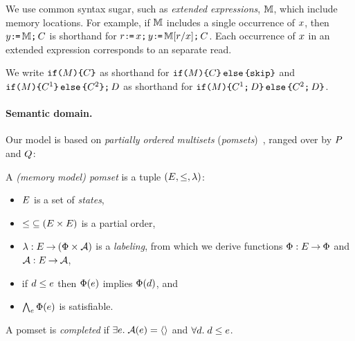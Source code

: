 We use common syntax sugar, such as \emph{extended expressions}, $\mathbb{M}$,
which include memory locations.  For example, if $\mathbb{M}$ includes a single
occurrence of $x$, then $y\texttt{:}\mkern-1mu\texttt{=}\,\mathbb{M}\texttt{;}\,\allowbreak C$ is shorthand for
$r\texttt{:}\mkern-1mu\texttt{=}\,x\texttt{;}\,\allowbreak y\texttt{:}\mkern-1mu\texttt{=}\,\mathbb{M}[r/x]\texttt{;}\,\allowbreak C$.  Each
occurrence of $x$ in an extended expression corresponds to an separate
read.

We write
$\texttt{if}\allowbreak\texttt{(}M\texttt{)} \allowbreak\texttt{\{} C \texttt{\}}$ as shorthand for
$\texttt{if}\allowbreak\texttt{(}M\texttt{)} \allowbreak\texttt{\{} C\texttt{\}}\,\allowbreak\texttt{else}\allowbreak\,\texttt{\{} \texttt{skip}\texttt{\}}$ and
$\texttt{if}\allowbreak\texttt{(}M\texttt{)} \allowbreak\texttt{\{} C^1 \texttt{\}}\,\allowbreak\texttt{else}\allowbreak\,\texttt{\{} C^2 \texttt{\}} \texttt{;}\,\allowbreak D$ as shorthand for
$\texttt{if}\allowbreak\texttt{(}M\texttt{)} \allowbreak\texttt{\{} C^1 \texttt{;}\,\allowbreak D\texttt{\}}\,\allowbreak\texttt{else}\allowbreak\,\texttt{\{} C^2 \texttt{;}\,\allowbreak D\texttt{\}}$.

\paragraph{Semantic domain.}
Our model is based on \emph{partially ordered multisets}
(\emph{pomsets})~\cite{GISCHER1988199}, ranged over by $P$ and $Q$:
\begin{definition}
  \label{def:mmpomset}
  A \emph{(memory model) pomset} is a tuple
  $(\Event, {\le}, %
  \labeling)$: %
  \begin{itemize}
  \item $E$ is a set of \emph{states},
  \item ${\le} \subseteq (E\times E)$ is a partial order, 
  \item $\lambda: E \mathbin\rightarrow (\Phi\times\mathcal{A})$ is a \emph{labeling},
    from which we derive functions $\Phi:E\mathbin\rightarrow\Phi$ and $\mathcal{A}:E\mathbin\rightarrow\mathcal{A}$,
  \item if $d\le e$ then $\Phi(e)$ implies
    $\Phi(d)$, and
  \item $\bigwedge_{e}\Phi(e)$ is satisfiable.
  \end{itemize}
  A pomset is \emph{completed} if $\exists e.\;\mathcal{A}(e)=\langle\rangle$ and $\forall d.\;d\le e$.
\end{definition}


